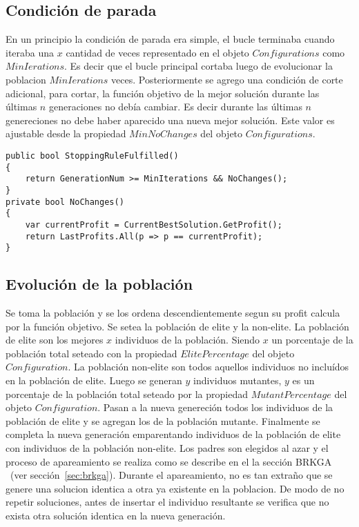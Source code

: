 \subsection{Condición de parada}

En un principio la condición de parada era simple, el bucle terminaba cuando iteraba una $x$ cantidad de veces representado en el objeto $Configurations$ como $MinIerations$. Es decir que el bucle principal cortaba luego de evolucionar la poblacion $MinIerations$ veces. Posteriormente se agrego una condición de corte adicional, para cortar, la función objetivo de la mejor solución durante las últimas $n$ generaciones no debía cambiar. Es decir durante las últimas $n$ genereciones no debe haber aparecido una nueva mejor solución. Este valor es ajustable desde la propiedad $MinNoChanges$ del objeto $Configurations$.

\bigskip

\begin{minipage}{\textwidth}
\begin{lstlisting} 
public bool StoppingRuleFulfilled()
{ 
    return GenerationNum >= MinIterations && NoChanges();
}
private bool NoChanges()
{
	var currentProfit = CurrentBestSolution.GetProfit();
	return LastProfits.All(p => p == currentProfit);
}
\end{lstlisting}
\end{minipage}

\subsection{Evolución de la población}

Se toma la población y se los ordena descendientemente segun su profit calcula por la función objetivo. Se setea la población de elite y la non-elite. La población de elite son los mejores $x$ individuos de la población. Siendo $x$ un porcentaje de la población total seteado con la propiedad $ElitePercentage$ del objeto $Configuration$. La población non-elite son todos aquellos individuos no incluídos en la población de elite. Luego se generan $y$ individuos mutantes, $y$ es un porcentaje de la población total seteado por la propiedad $MutantPercentage$ del objeto $Configuration$. Pasan a la nueva genereción todos los individuos de la población de elite y se agregan los de la población mutante. Finalmente se completa la nueva generación emparentando individuos de la población de elite con individuos de la población non-elite. Los padres son elegidos al azar y el proceso de apareamiento se realiza como se describe en el la sección BRKGA ~(ver sección~\ref{sec:brkga}). Durante el apareamiento, no es tan extraño que se genere una solucion identica a otra ya existente en la poblacion. De modo de no repetir soluciones, antes de insertar el individuo resultante se verifica que no exista otra solución identica en la nueva generación.


